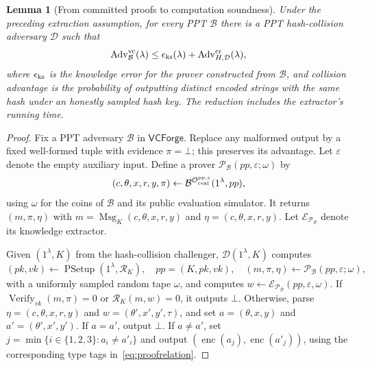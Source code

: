 \documentclass[10pt,letterpaper]{article}
\newtheorem{lemma}{Lemma}
\newcommand{\Verify}{\operatorname{Verify}}
\newcommand{\enc}{\operatorname{enc}}
\newcommand{\Msg}{\operatorname{Msg}}
\newcommand{\EvalO}{\mathcal O_{\rm eval}}
\begin{document}
\begin{lemma}[From committed proofs to computation soundness]
\label{lem:commitments}
Under the preceding extraction assumption, for every PPT $\mathcal B$ there is a PPT hash-collision adversary $\mathcal D$ such that
\[
 \operatorname{Adv}^{\rm vc}_{\mathcal B}(\lambda)
 \leq\epsilon_{\rm ks}(\lambda)
       +\operatorname{Adv}^{\rm cr}_{H,\mathcal D}(\lambda),
\]
where $\epsilon_{\rm ks}$ is the knowledge error for the prover constructed from $\mathcal B$, and collision advantage is the probability of outputting distinct encoded strings with the same hash under an honestly sampled hash key. The reduction includes the extractor's running time.
\end{lemma}
\begin{proof}
Fix a PPT adversary $\mathcal B$ in $\mathsf{VCForge}$. Replace any malformed output by a fixed well-formed tuple with evidence $\pi=\bot$; this preserves its advantage. Let $\varepsilon$ denote the empty auxiliary input. Define a prover $\mathcal P_{\mathcal B}(pp,\varepsilon;\omega)$ by
\[
 (c,\theta,x,r,y,\pi)\leftarrow\mathcal B^{\EvalO^{pp,\varepsilon}}(1^\lambda,pp),
\]
using $\omega$ for the coins of $\mathcal B$ and its public evaluation simulator. It returns $(m,\pi,\eta)$ with $m=\Msg_K(c,\theta,x,r,y)$ and $\eta=(c,\theta,x,r,y)$. Let $\mathcal E_{\mathcal P_{\mathcal B}}$ denote its knowledge extractor.

Given $(1^\lambda,K)$ from the hash-collision challenger, $\mathcal D(1^\lambda,K)$ computes
\[
 (pk,vk)\leftarrow\operatorname{PSetup}(1^\lambda,\mathcal R_K),\quad
 pp=(K,pk,vk),\quad
 (m,\pi,\eta)\leftarrow\mathcal P_{\mathcal B}(pp,\varepsilon;\omega),
\]
with a uniformly sampled random tape $\omega$, and computes $w\leftarrow\mathcal E_{\mathcal P_{\mathcal B}}(pp,\varepsilon,\omega)$. If $\Verify_{vk}(m,\pi)=0$ or $\mathcal R_K(m,w)=0$, it outputs $\bot$. Otherwise, parse $\eta=(c,\theta,x,r,y)$ and $w=(\theta',x',y',\tau)$, and set $a=(\theta,x,y)$ and $a'=(\theta',x',y')$. If $a=a'$, output $\bot$. If $a\ne a'$, set $j=\min\{i\in\{1,2,3\}:a_i\ne a'_i\}$ and output $(\enc(a_j),\enc(a'_j))$, using the corresponding type tags in~\eqref{eq:proofrelation}.


\end{proof}
\end{document}
